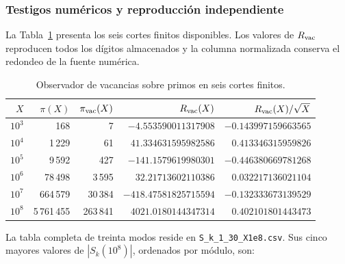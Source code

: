 \subsubsection{Testigos numéricos y reproducción independiente}

La Tabla~\ref{tab:f051-rvac-powers} presenta los seis cortes finitos
disponibles. Los valores de \(R_{\rm vac}\) reproducen todos los d\'igitos
almacenados y la columna normalizada conserva el redondeo de la fuente
num\'erica.

\begin{table}[htbp]
\centering
\small
\begin{tabular}{rrrrr}
\toprule
\(X\) & \(\pi(X)\) & \(\pi_{\rm vac}(X)\) & \(R_{\rm vac}(X)\)
 & \(R_{\rm vac}(X)/\sqrt X\)\\
\midrule
\(10^3\) & 168 & 7 & \(-4.553590011317908\) & \(-0.143997159663565\)\\
\(10^4\) & 1\,229 & 61 & \(41.334631595982586\) & \(0.413346315959826\)\\
\(10^5\) & 9\,592 & 427 & \(-141.1579619980301\) & \(-0.446380669781268\)\\
\(10^6\) & 78\,498 & 3\,595 & \(32.21713602110386\) & \(0.032217136021104\)\\
\(10^7\) & 664\,579 & 30\,384 & \(-418.47581825715594\) & \(-0.132333673139529\)\\
\(10^8\) & 5\,761\,455 & 263\,841 & \(4021.0180144347314\) & \(0.402101801443473\)\\
\bottomrule
\end{tabular}
\caption{Observador de vacancias sobre primos en seis cortes finitos.}
\label{tab:f051-rvac-powers}
\end{table}

La tabla completa de treinta modos reside en
\texttt{S\_k\_1\_30\_X1e8.csv}. Sus cinco mayores valores de
\(|S_k(10^8)|\), ordenados por m\'odulo, son:


